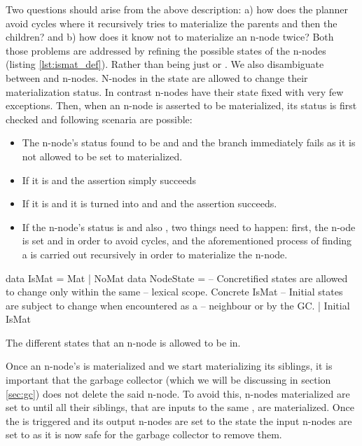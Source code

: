 Two questions should arise from the above description: a) how does the
planner avoid cycles where it recursively tries to materialize the
parents and then the children? and b) how does it know not to
materialize an n-node twice? Both those problems are addressed by
refining the possible states of the n-nodes (listing
\ref{lst:ismat_def}). Rather than being just  or
. We also disambiguate between  and
 n-nodes. N-nodes in the  state are allowed
to change their materialization status. In contrast 
n-nodes have their state fixed with very few exceptions. Then, when an
n-node is asserted to be materialized, its status is first checked and
following scenaria are possible:

\begin{itemize}
\item The n-node's status found to be  and 
  and the branch immediately fails as it is not allowed to be set to
  materialized.
\item If it is  and  the assertion simply
  succeeds
\item If it is  and  it is turned into
   and  and the assertion succeeds.
\item If the n-node's status is  and also ,
  two things need to happen: first, the n-ode is set  and
   in order to avoid cycles, and the aforementioned
  process of finding a  is carried out recursively in
  order to materialize the n-node.
\end{itemize}

\begin{code}
\begin{haskellcode}
data IsMat = Mat | NoMat
data NodeState =
  -- Concretified states are allowed to change only within the same
  -- lexical scope.
  Concrete IsMat
  -- Initial states are subject to change when encountered as a
  -- neighbour or by the GC.
  | Initial IsMat
\end{haskellcode}
  \caption{\label{lst:ismat_def}The different states that an n-node is
    allowed to be in.}
\end{code}

Once an n-node's is materialized and we start materializing its
siblings, it is important that the garbage collector (which we will be
discussing in section \ref{sec:gc}) does not delete the said n-node. To
avoid this, n-nodes materialized are set to 
until all their siblings, that are inputs to the same ,
are materialized. Once the  is triggered and its output
n-nodes are set to the  state the input n-nodes are set
to  as it is now safe for the garbage collector to
remove them.


